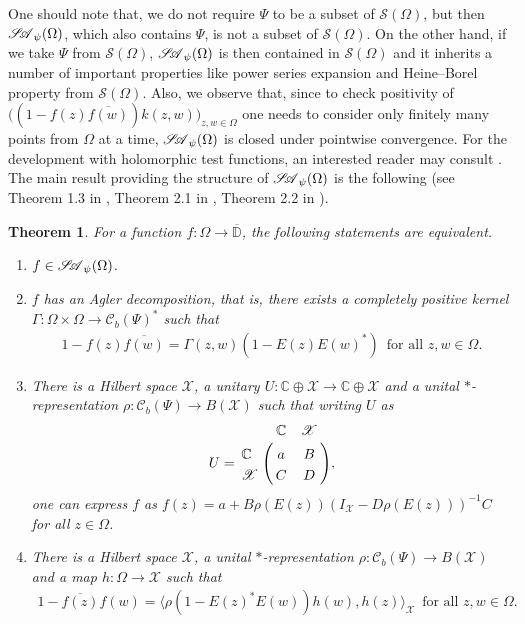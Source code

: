 \documentclass[12pt]{amsart}
\newtheorem{theorem}{Theorem}[section]
\theoremstyle{definition}
\numberwithin{equation}{section}
\newcommand{\X}{\mathscr{X}}
\newcommand{\D}{\mathbb{D}}
\newcommand{\SA}{\mathscr{S\mspace{-5mu}A}}
\newcommand{\SApO}{\mathscr{S\mspace{-5mu}A}_\psi (\Omega)}
\newcommand{\CB}{\mathcal{C}_b(\Psi)}
\begin{document}
One should note that, we do not require $\Psi$ to be a subset of $\mathscr{S}(\Omega)$, but then $\SA_\psi(\Omega)$, which also contains $\Psi$, is not a subset of $\mathscr{S}(\Omega)$. On the other hand, if we take $\Psi$ from $\mathscr{S}(\Omega)$, $\SA_\psi(\Omega)$ is then contained in $\mathscr{S}(\Omega)$ and it inherits a number of important properties like power series expansion and Heine–Borel property from $\mathscr{S}(\Omega)$. Also, we observe that, since to check positivity of $\big((1-f(z)\overline{f(w)})k(z,w)\big)_{z,w\in \Omega}$ one needs to consider only finitely many points from $\Omega$ at a time, $\SA_\psi(\Omega)$ is closed under pointwise convergence. For the development with holomorphic test functions, an interested reader may consult \cite{BhatBisCha}. The main result providing the structure of $\SA_\psi(\Omega)$ is the following (see Theorem 1.3 in \cite{B_H}, Theorem 2.1 in \cite{BhatBisCha}, Theorem 2.2 in \cite{D-M}).
\begin{theorem}\label{CharacterSchurAgler}
	For a function $f:\Omega \rightarrow \overline{\D}$, the following statements are equivalent.
	\begin{enumerate}
		\item $f\in \SApO$.
		\item $f$ has an Agler decomposition, that is, there exists a completely
		positive kernel $\Gamma:\Omega\times\Omega\rightarrow\CB^*$ such that 
		\begin{align}\label{AlterAglerDecomp}
			1-f(z)\overline{f(w)}=\Gamma(z,w)(1-E(z)E(w)^*)\,\,\,\text{for all $z,w\in \Omega$.}
		\end{align}
		\item\label{Realization} There is a Hilbert space $\X$, a unitary $U:\mathbb{C}\oplus \X\rightarrow \mathbb{C}\oplus \X$ and a unital $*$-representation $\rho:\CB\rightarrow B(\X)$ such that writing $U$ as 
		\begin{align*}
			U =
			\bordermatrix{ & \mathbb{C} & \X \cr
				\mathbb{C} & a & B \cr
				\X & C & D},
		\end{align*}
		one can express $f$ as $f(z)=a+B\rho(E(z))(I_{\X}-D\rho(E(z)))^{-1}C$ for all $z\in \Omega$.
		\item There is a Hilbert space $\X$, a unital $*$-representation $\rho:\CB\rightarrow B(\X)$ and a map $h:\Omega\rightarrow \X$ such that 
		\begin{align}\label{AglerDecompInner}
			1-\overline{f(z)}f(w)=\langle \rho(1-E(z)^* E(w))h(w),h(z)\rangle_\X \,\,\,\text{for all $z,w\in \Omega$.}
		\end{align}
		
	\end{enumerate}
\end{theorem}
\end{document}
